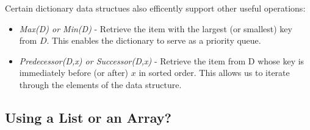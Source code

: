	Certain dictionary data structues also efficently support other useful operations:
		\begin{itemize}
			\item \textit{Max(D) or Min(D)} - Retrieve the item with the largest (or smallest) key from $D$. This enables the dictionary to serve as a priority queue.
			\item \textit{Predecessor(D,x) or Successor(D,x)} - Retrieve the item from D whose key is immediately before (or after) $x$ in sorted order. This allows us to iterate through the elements of the data structure.
		\end{itemize}
	\subsection{Using a List or an Array?}

